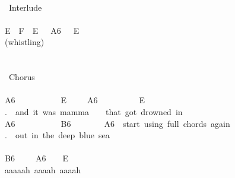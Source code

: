 {\\
\lbrack\ Interlude\rbrack\\
\\
E\ \ F\ \ E\ \ \ A6\ \ \ E\\
(whistling)\\
\\
\\
\lbrack\ Chorus\rbrack\\
\\
A6\ \ \ \ \ \ \ \ \ \ \ E\ \ \ \ \ A6\ \ \ \ \ \ \ \ \ \ E\\
.\ \ and\ it\ was\ mamma\ \ \ \ that\ got\ drowned\ in\\
A6\ \ \ \ \ \ \ \ \ \ \ B6\ \ \ \ \ \ \ \ A6\ \lbrack\ start\ using\ \;full\;\ chords\ again\rbrack\\
.\ \ out\ in\ the\ deep\ blue\ sea\\
\\
B6\ \ \ \ \ A6\ \ \ \ E\\
aaaaah\ aaaah\ aaaah\\}

